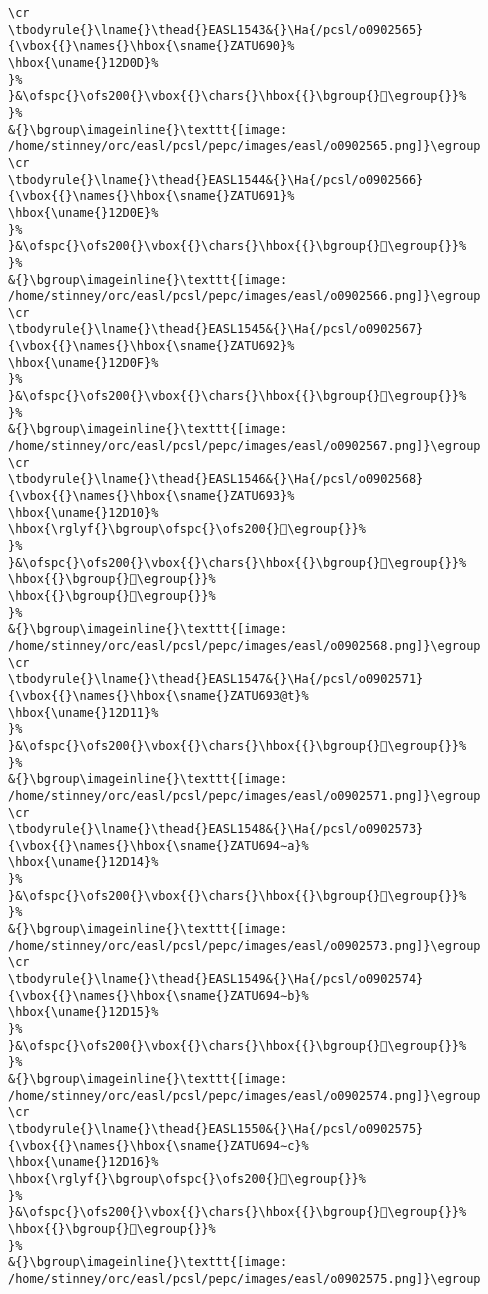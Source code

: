 \begin{verbatim}
\cr
\tbodyrule{}\lname{}\thead{}EASL1543&{}\Ha{/pcsl/o0902565}{\vbox{{}\names{}\hbox{\sname{}ZATU690}%
\hbox{\uname{}12D0D}%
}%
}&\ofspc{}\ofs200{}\vbox{{}\chars{}\hbox{{}\bgroup{}𒴍\egroup{}}%
}%
&{}\bgroup\imageinline{}\texttt{[image: /home/stinney/orc/easl/pcsl/pepc/images/easl/o0902565.png]}\egroup
\cr
\tbodyrule{}\lname{}\thead{}EASL1544&{}\Ha{/pcsl/o0902566}{\vbox{{}\names{}\hbox{\sname{}ZATU691}%
\hbox{\uname{}12D0E}%
}%
}&\ofspc{}\ofs200{}\vbox{{}\chars{}\hbox{{}\bgroup{}𒴎\egroup{}}%
}%
&{}\bgroup\imageinline{}\texttt{[image: /home/stinney/orc/easl/pcsl/pepc/images/easl/o0902566.png]}\egroup
\cr
\tbodyrule{}\lname{}\thead{}EASL1545&{}\Ha{/pcsl/o0902567}{\vbox{{}\names{}\hbox{\sname{}ZATU692}%
\hbox{\uname{}12D0F}%
}%
}&\ofspc{}\ofs200{}\vbox{{}\chars{}\hbox{{}\bgroup{}𒴏\egroup{}}%
}%
&{}\bgroup\imageinline{}\texttt{[image: /home/stinney/orc/easl/pcsl/pepc/images/easl/o0902567.png]}\egroup
\cr
\tbodyrule{}\lname{}\thead{}EASL1546&{}\Ha{/pcsl/o0902568}{\vbox{{}\names{}\hbox{\sname{}ZATU693}%
\hbox{\uname{}12D10}%
\hbox{\rglyf{}\bgroup\ofspc{}\ofs200{}𒴐\egroup{}}%
}%
}&\ofspc{}\ofs200{}\vbox{{}\chars{}\hbox{{}\bgroup{}𒴐\egroup{}}%
\hbox{{}\bgroup{}𒴒\egroup{}}%
\hbox{{}\bgroup{}𒴓\egroup{}}%
}%
&{}\bgroup\imageinline{}\texttt{[image: /home/stinney/orc/easl/pcsl/pepc/images/easl/o0902568.png]}\egroup
\cr
\tbodyrule{}\lname{}\thead{}EASL1547&{}\Ha{/pcsl/o0902571}{\vbox{{}\names{}\hbox{\sname{}ZATU693@t}%
\hbox{\uname{}12D11}%
}%
}&\ofspc{}\ofs200{}\vbox{{}\chars{}\hbox{{}\bgroup{}𒴑\egroup{}}%
}%
&{}\bgroup\imageinline{}\texttt{[image: /home/stinney/orc/easl/pcsl/pepc/images/easl/o0902571.png]}\egroup
\cr
\tbodyrule{}\lname{}\thead{}EASL1548&{}\Ha{/pcsl/o0902573}{\vbox{{}\names{}\hbox{\sname{}ZATU694∼a}%
\hbox{\uname{}12D14}%
}%
}&\ofspc{}\ofs200{}\vbox{{}\chars{}\hbox{{}\bgroup{}𒴔\egroup{}}%
}%
&{}\bgroup\imageinline{}\texttt{[image: /home/stinney/orc/easl/pcsl/pepc/images/easl/o0902573.png]}\egroup
\cr
\tbodyrule{}\lname{}\thead{}EASL1549&{}\Ha{/pcsl/o0902574}{\vbox{{}\names{}\hbox{\sname{}ZATU694∼b}%
\hbox{\uname{}12D15}%
}%
}&\ofspc{}\ofs200{}\vbox{{}\chars{}\hbox{{}\bgroup{}𒴕\egroup{}}%
}%
&{}\bgroup\imageinline{}\texttt{[image: /home/stinney/orc/easl/pcsl/pepc/images/easl/o0902574.png]}\egroup
\cr
\tbodyrule{}\lname{}\thead{}EASL1550&{}\Ha{/pcsl/o0902575}{\vbox{{}\names{}\hbox{\sname{}ZATU694∼c}%
\hbox{\uname{}12D16}%
\hbox{\rglyf{}\bgroup\ofspc{}\ofs200{}𒴖\egroup{}}%
}%
}&\ofspc{}\ofs200{}\vbox{{}\chars{}\hbox{{}\bgroup{}𒴖\egroup{}}%
\hbox{{}\bgroup{}𒴗\egroup{}}%
}%
&{}\bgroup\imageinline{}\texttt{[image: /home/stinney/orc/easl/pcsl/pepc/images/easl/o0902575.png]}\egroup

\end{verbatim}
